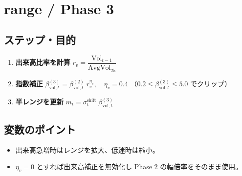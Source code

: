 
\section*{range / Phase 3}\nopagebreak[4]
\subsection*{ステップ・目的}
\begin{flushleft}
\begin{enumerate}
  \item \textbf{出来高比率を計算}\;
        \( r_v = \dfrac{\text{Vol}_{t-1}}{\text{AvgVol}_{25}} \)
  \item \textbf{指数補正}\;
        \( \beta_{\text{vol},t}^{(3)}
           =\beta_{\text{vol},t}^{(2)}\;r_v^{\eta_v},
           \quad \eta_v = 0.4 \)
        （\(0.2 \le \beta_{\text{vol},t}^{(3)} \le 5.0\) でクリップ）
  \item \textbf{半レンジを更新}\;
        \( m_t=\sigma_t^{\text{shift}}\;\beta_{\text{vol},t}^{(3)} \)
\end{enumerate}
\end{flushleft}

\subsection*{変数のポイント}
\begin{flushleft}
\begin{itemize}
  \item 出来高急増時はレンジを拡大、低迷時は縮小。  
  \item \(\eta_v=0\) とすれば出来高補正を無効化し  
        Phase 2 の幅倍率をそのまま使用。
\end{itemize}
\end{flushleft}


